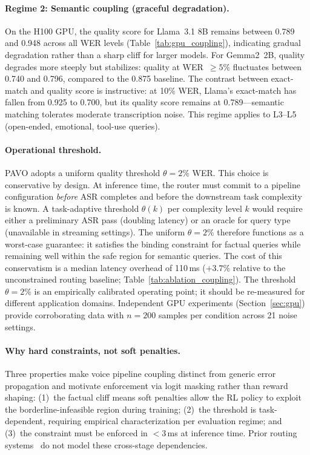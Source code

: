 \documentclass{article}
\begin{document}
\paragraph{Regime 2: Semantic coupling (graceful degradation).}
On the H100 GPU, the quality score for Llama~3.1 8B remains between 0.789 and 0.948 across all WER levels (Table~\ref{tab:gpu_coupling}), indicating gradual degradation rather than a sharp cliff for larger models. For Gemma2~2B, quality degrades more steeply but stabilizes: quality at WER~$\geq 5\%$ fluctuates between 0.740 and 0.796, compared to the 0.875 baseline. The contrast between exact-match and quality score is instructive: at 10\% WER, Llama's exact-match has fallen from 0.925 to 0.700, but its quality score remains at 0.789---semantic matching tolerates moderate transcription noise. This regime applies to L3--L5 (open-ended, emotional, tool-use queries).

\paragraph{Operational threshold.}
PAVO adopts a uniform quality threshold $\theta = 2\%$ WER. This choice is conservative by design. At inference time, the router must commit to a pipeline configuration \emph{before} ASR completes and before the downstream task complexity is known. A task-adaptive threshold $\theta(k)$ per complexity level $k$ would require either a preliminary ASR pass (doubling latency) or an oracle for query type (unavailable in streaming settings). The uniform $\theta = 2\%$ therefore functions as a worst-case guarantee: it satisfies the binding constraint for factual queries while remaining well within the safe region for semantic queries. The cost of this conservatism is a median latency overhead of 110\,ms ($+3.7\%$ relative to the unconstrained routing baseline; Table~\ref{tab:ablation_coupling}). The threshold $\theta=2\%$ is an empirically calibrated operating point; it should be re-measured for different application domains. Independent GPU experiments (Section~\ref{sec:gpu}) provide corroborating data with $n=200$ samples per condition across 21 noise settings.

\paragraph{Why hard constraints, not soft penalties.}
Three properties make voice pipeline coupling distinct from generic error propagation and motivate enforcement via logit masking rather than reward shaping: (1)~the factual cliff means soft penalties allow the RL policy to exploit the borderline-infeasible region during training; (2)~the threshold is task-dependent, requiring empirical characterization per evaluation regime; and (3)~the constraint must be enforced in $<$3\,ms at inference time. Prior routing systems~\citep{clipper2017,romero2021infaas,gujarati2023shepherd} do not model these cross-stage dependencies.
\end{document}
